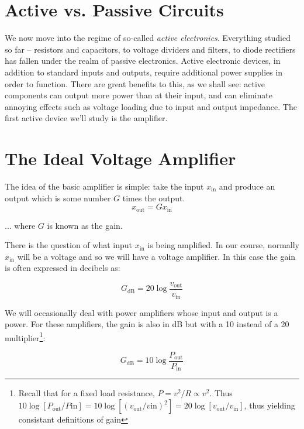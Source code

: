 \documentclass{tufte-book}
\begin{document}
\section{Active vs. Passive Circuits}
We now move into the regime of so-called \textit{active electronics}. Everything studied so far -- resistors and capacitors, to voltage dividers and filters, to diode rectifiers has fallen under the realm of passive electronics. Active electronic devices, in addition to standard inputs and outputs, require additional power supplies in order to function. There are great benefits to this, as we shall see: active components can output more power than at their input, and can eliminate annoying effects such as voltage loading due to input and output impedance. The first active device we'll study is the amplifier.
\section{The Ideal Voltage Amplifier}
The idea of the basic amplifier is simple: take the input $x_\text{in}$ and produce an output which is some number $G$ times the output.
\begin{equation}
\label{eq:simple_amp}
x_\text{out} = Gx_\text{in}
\end{equation}

\noindent ... where $G$ is known as the gain.

There is the question of what input $x_\text{in}$ is being amplified. In our course, normally $x_\text{in}$ will be a voltage and so we will have a voltage amplifier. In this case the gain is often expressed in decibels as:

\begin{equation}
\label{eq:voltage_amp_dB}
G_\text{dB} = 20\log\frac{v_\text{out}}{v_\text{in}} 
\end{equation}

We will occasionally deal with power amplifiers whose input and output is a power. For these amplifiers, the gain is also in dB but with a 10 instead of a 20 multiplier\footnote{Recall that for a fixed load resistance, $P = v^2/R \propto v^2$. Thus $10\log\left[P_\text{out}/P\text{in}\right] = 10\log\left[\left(v_\text{out}/v\text{in}\right)^2\right] = 20\log\left[v_\text{out}/v_\text{in}\right]$, thus yielding consistant definitions of gain}:

\begin{equation}
\label{eq:power_amp_dB}
G_\text{dB} = 10\log\frac{P_\text{out}}{P_\text{in}} 
\end{equation}
\end{document}
